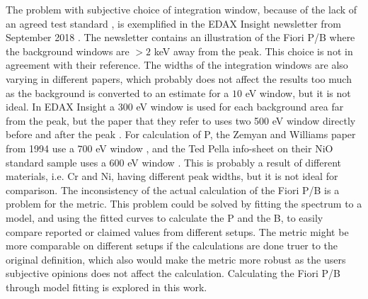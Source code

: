 The problem with subjective choice of integration window, because of the lack of an agreed test standard \cite{williams_standard_definitions_1986}, is exemplified in the EDAX Insight newsletter from September 2018 \cite{edax_insight_2018}.
The newsletter contains an illustration of the Fiori P/B where the background windows are $> 2$ keV away from the peak.
This choice is not in agreement with their reference.
The widths of the integration windows are also varying in different papers, which probably does not affect the results too much as the background is converted to an estimate for a $10$ eV window, but it is not ideal.
In EDAX Insight a $300$ eV window is used for each background area far from the peak, but the paper that they refer to uses two 500 eV window directly before and after the peak \cite{egerton_nio_characterization_1994}.
For calculation of P, the Zemyan and Williams paper from 1994 use a $700$ eV window \cite{zemyan_standard_performance_1994}, and the Ted Pella info-sheet on their NiO standard sample uses a $600$ eV window \cite{ted_pella_nio_tem_2019}.
This is probably a result of different materials, i.e. Cr and Ni, having different peak widths, but it is not ideal for comparison.
The inconsistency of the actual calculation of the Fiori P/B is a problem for the metric.
This problem could be solved by fitting the spectrum to a model, and using the fitted curves to calculate the P and the B, to easily compare reported or claimed values from different setups.
The metric might be more comparable on different setups if the calculations are done truer to the original definition, which also would make the metric more robust as the users subjective opinions does not affect the calculation.
Calculating the Fiori P/B through model fitting is explored in this work.





